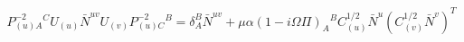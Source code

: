\begin{equation}
P_{(u)A}^{-2}{}^CU_{(u)}{\bar N}^{uv}U_{(v)}P_{(u)C}^{-2}{}^B=\delta_A^B{\bar N}^{uv}
+\mu\alpha(1-i\Omega\Pi)_A{}^BC^{1/2}_{(u)}{\bar N}^u(C^{1/2}_{(v)}{\bar N}^v)^T
\end{equation}

